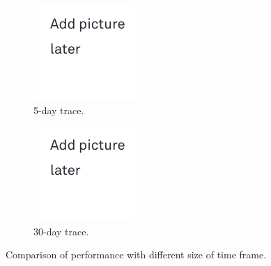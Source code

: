 \begin{figure}[t!]
	\centering
	
	\begin{subfigure}[b]{0.49\linewidth}
		\includegraphics[width=\linewidth]{pics/todo.png}
		\caption{5-day trace.}
	\end{subfigure}
	\begin{subfigure}[b]{0.49\linewidth}
		\includegraphics[width=\linewidth]{pics/todo.png}
		\caption{30-day trace.}
	\end{subfigure}
	\caption{Comparison of performance with different size of time frame.}
	\label{fig:cache6}
\end{figure}


